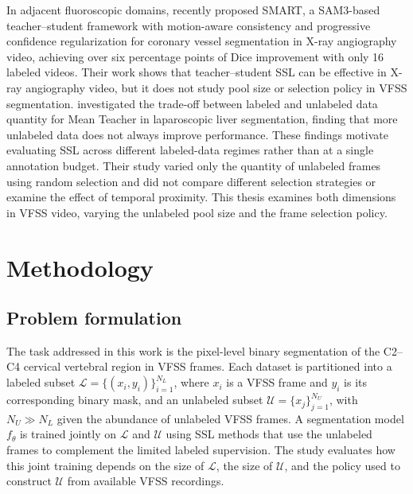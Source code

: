 \documentclass[
  msc,
  american
]{ThesisPUC_v2}
\begin{document}
In adjacent fluoroscopic domains, \citet{ref_luo_smart2026} recently proposed SMART, a SAM3-based teacher--student framework with motion-aware consistency and progressive confidence regularization for coronary vessel segmentation in X-ray angiography video, achieving over six percentage points of Dice improvement with only 16 labeled videos. Their work shows that teacher--student SSL can be effective in X-ray angiography video, but it does not study pool size or selection policy in VFSS segmentation. \citet{ref_fu2019} investigated the trade-off between labeled and unlabeled data quantity for Mean Teacher in laparoscopic liver segmentation, finding that more unlabeled data does not always improve performance. These findings motivate evaluating SSL across different labeled-data regimes rather than at a single annotation budget. Their study varied only the quantity of unlabeled frames using random selection and did not compare different selection strategies or examine the effect of temporal proximity. This thesis examines both dimensions in VFSS video, varying the unlabeled pool size and the frame selection policy.



\chapter{Methodology}
\label{chap:method}

\section{Problem formulation}
\label{sec:method-formulation}

The task addressed in this work is the pixel-level binary segmentation of the C2--C4 cervical vertebral region in VFSS frames. Each dataset is partitioned into a labeled subset $\mathcal{L} = \{(x_i, y_i)\}_{i=1}^{N_L}$, where $x_i$ is a VFSS frame and $y_i$ is its corresponding binary mask, and an unlabeled subset $\mathcal{U} = \{x_j\}_{j=1}^{N_U}$, with $N_U \gg N_L$ given the abundance of unlabeled VFSS frames. A segmentation model $f_\theta$ is trained jointly on $\mathcal{L}$ and $\mathcal{U}$ using SSL methods that use the unlabeled frames to complement the limited labeled supervision. The study evaluates how this joint training depends on the size of $\mathcal{L}$, the size of $\mathcal{U}$, and the policy used to construct $\mathcal{U}$ from available VFSS recordings.
\end{document}
